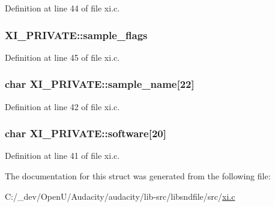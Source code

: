 Definition at line 44 of file xi.\+c.

\subsubsection[{\texorpdfstring{sample\+\_\+flags}{sample_flags}}]{ X\+I\+\_\+\+P\+R\+I\+V\+A\+T\+E\+::sample\+\_\+flags}\hypertarget{struct_x_i___p_r_i_v_a_t_e_a12634f288d83a961e0e834c76beebd69}{}\label{struct_x_i___p_r_i_v_a_t_e_a12634f288d83a961e0e834c76beebd69}


Definition at line 45 of file xi.\+c.

\subsubsection[{\texorpdfstring{sample\+\_\+name}{sample_name}}]{\setlength{\rightskip}{0pt plus 5cm}char X\+I\+\_\+\+P\+R\+I\+V\+A\+T\+E\+::sample\+\_\+name\mbox{[}22\mbox{]}}\hypertarget{struct_x_i___p_r_i_v_a_t_e_a169e3fb7547ff939aa80065fc747fa89}{}\label{struct_x_i___p_r_i_v_a_t_e_a169e3fb7547ff939aa80065fc747fa89}


Definition at line 42 of file xi.\+c.

\subsubsection[{\texorpdfstring{software}{software}}]{\setlength{\rightskip}{0pt plus 5cm}char X\+I\+\_\+\+P\+R\+I\+V\+A\+T\+E\+::software\mbox{[}20\mbox{]}}\hypertarget{struct_x_i___p_r_i_v_a_t_e_ae3247b2582a6b769380112a75241cb0a}{}\label{struct_x_i___p_r_i_v_a_t_e_ae3247b2582a6b769380112a75241cb0a}


Definition at line 41 of file xi.\+c.



The documentation for this struct was generated from the following file\+:\begin{DoxyCompactItemize}
\item 
C\+:/\+\_\+dev/\+Open\+U/\+Audacity/audacity/lib-\/src/libsndfile/src/\hyperlink{xi_8c}{xi.\+c}\end{DoxyCompactItemize}
